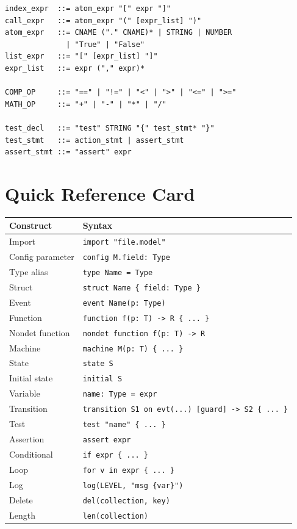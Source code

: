 \documentclass[11pt,letterpaper]{article}
\begin{document}
\begin{lstlisting}[numbers=none,basicstyle=\ttfamily\footnotesize]
index_expr  ::= atom_expr "[" expr "]"
call_expr   ::= atom_expr "(" [expr_list] ")"
atom_expr   ::= CNAME ("." CNAME)* | STRING | NUMBER
              | "True" | "False"
list_expr   ::= "[" [expr_list] "]"
expr_list   ::= expr ("," expr)*

COMP_OP     ::= "==" | "!=" | "<" | ">" | "<=" | ">="
MATH_OP     ::= "+" | "-" | "*" | "/"

test_decl   ::= "test" STRING "{" test_stmt* "}"
test_stmt   ::= action_stmt | assert_stmt
assert_stmt ::= "assert" expr
\end{lstlisting}


\appendix
\section{Quick Reference Card}
\label{app:quickref}

\begin{center}
\small
\begin{tabular}{@{}p{4cm}p{9cm}@{}}
\toprule
\textbf{Construct} & \textbf{Syntax} \\
\midrule
Import             & \texttt{import "file.model"} \\
Config parameter   & \texttt{config M.field: Type} \\
Type alias         & \texttt{type Name = Type} \\
Struct             & \texttt{struct Name \{ field: Type \}} \\
Event              & \texttt{event Name(p: Type)} \\
Function           & \texttt{function f(p: T) -> R \{ ... \}} \\
Nondet function    & \texttt{nondet function f(p: T) -> R} \\
Machine            & \texttt{machine M(p: T) \{ ... \}} \\
State              & \texttt{state S} \\
Initial state      & \texttt{initial S} \\
Variable           & \texttt{name: Type = expr} \\
Transition         & \texttt{transition S1 on evt(...) [guard] -> S2 \{ ... \}} \\
Test               & \texttt{test "name" \{ ... \}} \\
Assertion          & \texttt{assert expr} \\
Conditional        & \texttt{if expr \{ ... \}} \\
Loop               & \texttt{for v in expr \{ ... \}} \\
Log                & \texttt{log(LEVEL, "msg \{var\}")} \\
Delete             & \texttt{del(collection, key)} \\
Length             & \texttt{len(collection)} \\
\bottomrule
\end{tabular}
\end{center}
\end{document}
